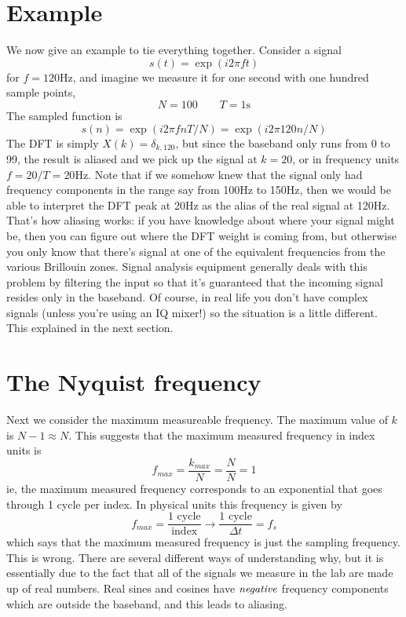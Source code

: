 \section{Example}

We now give an example to tie everything together. Consider a signal
\begin{displaymath}
s(t) = \exp (i 2\pi f t)
\end{displaymath}
for $f=120\textrm{Hz}$, and imagine we measure it for one second with one hundred sample points,
\begin{displaymath}
N=100 \qquad T=1\mathrm{s}
\end{displaymath}
The sampled function is
\begin{displaymath}
s(n) = \exp(i2\pi fnT/N) = \exp(i2\pi 120n/N)
\end{displaymath}
The DFT is simply $X(k)=\delta_{k,120}$, but since the baseband only runs from 0 to 99, the result is aliased and we pick up the signal at $k=20$, or in frequency units $f=20/T=20\mathrm{Hz}$. Note that if we somehow knew that the signal only had frequency components in the range say from 100Hz to 150Hz, then we would be able to interpret the DFT peak at 20Hz as the alias of the real signal at 120Hz. That's how aliasing works: if you have knowledge about where your signal might be, then you can figure out where the DFT weight is coming from, but otherwise you only know that there's signal at one of the equivalent frequencies from the various Brillouin zones. Signal analysis equipment generally deals with this problem by filtering the input so that it's guaranteed that the incoming signal resides only in the baseband. Of course, in real life you don't have complex signals (unless you're using an IQ mixer!) so the situation is a little different. This explained in the next section.

\section{The Nyquist frequency}

Next we consider the maximum measureable frequency. The maximum value of $k$ is $N-1\approx N$. This suggests that the maximum measured frequency in index units is
\begin{displaymath}
f_{max}=\frac{k_{max}}{N}=\frac{N}{N}=1
\end{displaymath}
ie, the maximum measured frequency corresponds to an exponential that goes through 1 cycle per index. In physical units this frequency is given by
\begin{displaymath}
f_{max}=\frac{\text{1 cycle}}{\text{index}}\rightarrow\frac{\text{1 cycle}}{\Delta t}=f_{s}
\end{displaymath}
which says that the maximum measured frequency is just the sampling frequency. This is wrong. There are several different ways of understanding why, but it is essentially due to the fact that all of the signals we measure in the lab are made up of real numbers. Real sines and cosines have $\emph{negative}$ frequency components which are outside the baseband, and this leads to aliasing.

